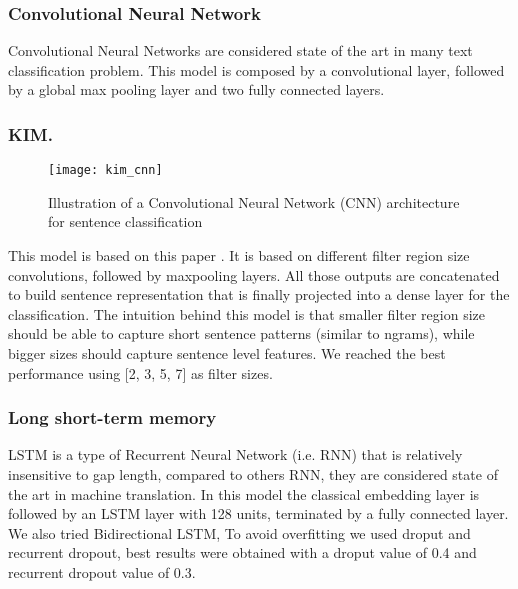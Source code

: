 \subsubsection{Convolutional Neural Network}
Convolutional Neural Networks are considered state of the art in many text classification problem.
This model is composed by a convolutional layer, followed by a global max pooling layer and two fully connected layers.

\subsubsection{KIM.}


\begin{figure}[h]
\footnotesize
\centering
\texttt{[image: kim\_cnn]}
\caption{\cite{zhang2015sensitivity} Illustration of a Convolutional Neural Network (CNN) architecture for sentence classification}
\label{fig:kim}
\end{figure}

This model is based on this paper \cite{kim2014convolutional}. It is based on different filter region size convolutions, followed by maxpooling layers.
All those outputs are concatenated to build sentence representation that is finally projected into a dense layer for the classification.
The intuition behind this model is that smaller filter region size should be able to capture short sentence patterns (similar to ngrams), while bigger sizes should capture sentence level features. We reached the best performance using [2, 3, 5, 7] as filter sizes.


\subsubsection{Long short-term memory}
LSTM is a type of Recurrent Neural Network (i.e. RNN) that is relatively insensitive to gap length, compared to others RNN, they are considered state of the art in machine translation.
In this model the classical embedding layer is followed by an LSTM layer with 128 units, terminated by a fully connected layer.
We also tried Bidirectional LSTM, 
To avoid overfitting we used droput and recurrent dropout, best results were obtained with a droput value of 0.4 and recurrent dropout value of 0.3.

